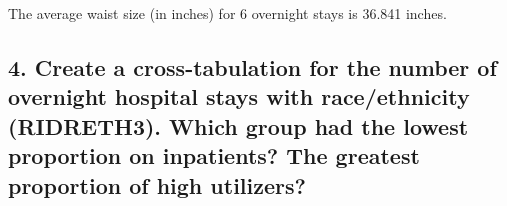 \documentclass[]{article}
\newenvironment{Shaded}{\begin{snugshade}}{\end{snugshade}}
\newcommand{\CommentTok}[1]{\textcolor[rgb]{0.56,0.35,0.01}{\textit{#1}}}
\newcommand{\DataTypeTok}[1]{\textcolor[rgb]{0.13,0.29,0.53}{#1}}
\newcommand{\DecValTok}[1]{\textcolor[rgb]{0.00,0.00,0.81}{#1}}
\newcommand{\KeywordTok}[1]{\textcolor[rgb]{0.13,0.29,0.53}{\textbf{#1}}}
\newcommand{\NormalTok}[1]{#1}
\newcommand{\OperatorTok}[1]{\textcolor[rgb]{0.81,0.36,0.00}{\textbf{#1}}}
\newcommand{\StringTok}[1]{\textcolor[rgb]{0.31,0.60,0.02}{#1}}
\begin{document}
The average waist size (in inches) for 6 overnight stays is 36.841
inches.

\hypertarget{create-a-cross-tabulation-for-the-number-of-overnight-hospital-stays-with-raceethnicity-ridreth3.-which-group-had-the-lowest-proportion-on-inpatients-the-greatest-proportion-of-high-utilizers}{%
\subsection{4. Create a cross-tabulation for the number of overnight
hospital stays with race/ethnicity (RIDRETH3). Which group had the
lowest proportion on inpatients? The greatest proportion of high
utilizers?}\label{create-a-cross-tabulation-for-the-number-of-overnight-hospital-stays-with-raceethnicity-ridreth3.-which-group-had-the-lowest-proportion-on-inpatients-the-greatest-proportion-of-high-utilizers}}

\begin{Shaded}
\end{Shaded}
\end{document}

